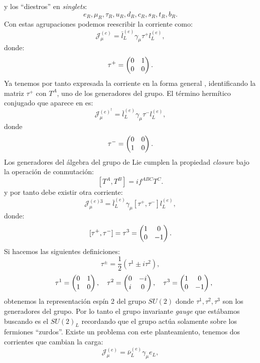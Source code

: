 \documentclass{article}
\theoremstyle{plain}
\theoremstyle{definition}
\begin{document}
	y los ``diestros'' en \textit{singlets}:
	\[e_R,\mu_R,\tau_R,u_R,d_R,c_R,s_R,t_R,b_R \text{.} \] 
	Con estas agrupaciones podemos reescribir la corriente como: 
	\[\mathcal{J}_\mu^{(e)} =\bar{l}^{(e)}_L \gamma_\mu\tau^+ l_L^{(e)},\]
	donde: 
	\[
	\tau^+ = \left(\begin{array}{@{}cc@{}}
	0 & 1 \\
	0 & 0
	\end{array} \right)\text{.}
	\] 
	Ya tenemos por tanto expresada la corriente en la forma general , identificando la matriz \(\tau^+\) con \(T^A\), uno de los generadores del grupo. El término hermítico conjugado que aparece en  es:
	\[
	\mathcal{J}_\mu^{(e)^\dagger} =\bar{l}^{(e)}_L \gamma_\mu\tau^- l_L^{(e)},
	\]
	donde
	\[
	\tau^- = \left(\begin{array}{@{}cc@{}}
	0 & 0 \\
	1 & 0
	\end{array} \right)\text{.}
	\]
	Los generadores del álgebra del grupo de Lie cumplen la propiedad \textit{closure} bajo la operación de conmutación:
	\[
	\left[T^A,T^B\right]= if^{ABC}T^C\text{.}
	\]
	y por tanto debe existir otra corriente:
	\[
	\mathcal{J}_\mu^{(e)3} =\bar{l}^{(e)}_L \gamma_\mu[\tau^+,\tau^-] l_L^{(e)},
	\]
	donde:
	\[
	[\tau^+,\tau^-] = \tau^3 = \left(\begin{array}{@{}cc@{}}
	1 & 0 \\
	0 & -1
	\end{array} \right)\text{.}
	\]
	Si hacemos las siguientes definiciones:
	\[
	\tau^\pm= \frac{1}{2}\left(\tau^1\pm i\tau^2\right),
	\]
	\[
	\quad
	\tau^1 = \left(\begin{array}{@{}cc@{}}
	0 & 1 \\
	1 & 0
	\end{array} \right),
	\quad
	\tau^2 = \left(\begin{array}{@{}cc@{}}
	0 & -i \\
	i & 0
	\end{array} \right),
	\quad
	\tau^3 = \left(\begin{array}{@{}cc@{}}
	1 & 0 \\
	0 & -1
	\end{array} \right),
	\]
	obtenemos la representación espín 2 del grupo \(SU(2)\) donde \(\tau^1,\tau^2,\tau^3 \) son los generadores del grupo. Por lo tanto el grupo invariante \textit{gauge}  que estábamos buscando es el \(SU(2)_L\) recordando que el grupo actúa solamente sobre los fermiones ``zurdos''. Existe un problema con este planteamiento, tenemos dos corrientes que cambian la carga: \[\mathcal{J}_\mu^{(e)} = \bar{\nu}_L^{(e)}\gamma_{\mu} e_L, \]
\end{document}

